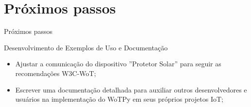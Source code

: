 \section{Próximos passos}

\begin{frame}{Próximos passos}

    \begin{block}{Desenvolvimento de Exemplos de Uso e Documentação}
        \begin{itemize}
            \item Ajustar a comunicação do dispositivo ''Protetor Solar'' para seguir as recomendações W3C-WoT;
            \item Escrever uma documentação detalhada para auxiliar outros desenvolvedores e usuários na implementação do WoTPy em seus próprios projetos IoT;
        \end{itemize}
    \end{block}
    
\end{frame}
